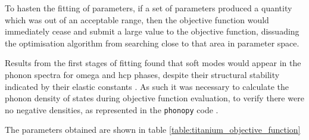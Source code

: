 \documentclass[a4paper,12pt,oneside,print,numbered,index,PageStyleIII]{PhDThesisPSnPDF}
\begin{document}
To hasten the fitting of parameters, if a set of parameters
produced a quantity which was out of an acceptable range, then the
objective function would immediately cease and submit a large value
to the objective function, dissuading the optimisation algorithm
from searching close to that area in parameter space.

Results from the first stages of fitting found that soft modes
would appear in the phonon spectra for omega and hcp phases,
despite their structural stability indicated by their elastic
constants \cite{Wallace1998,Nye1984}. As such it was necessary to calculate the phonon density
of states during objective function evaluation, to verify there
were no negative densities, as represented in the \texttt{phonopy} code
\cite{Togo2015}.

The parameters obtained are shown in table \ref{table:titanium_objective_function}
\end{document}
